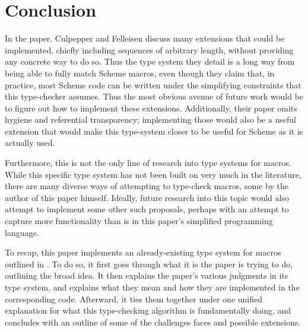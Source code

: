 \documentclass[11pt]{article}
\begin{document}
\section{Conclusion}
In the paper, Culpepper and Felleisen discuss many extensions that could be implemented, chiefly including sequences of arbitrary length, without providing any concrete way to do so. Thus the type system they detail is a long way from being able to fully match Scheme macros, even though they claim that, in practice, most Scheme code can be written under the simplifying constraints that this type-checker assumes. Thus the most obvious avenue of future work would be to figure out how to implement these extensions. Additionally, their paper omits hygiene and referential transparency; implementing those would also be a useful extension that would make this type-system closer to be useful for Scheme as it is actually used.\par

Furthermore, this is not the only line of research into type systems for macros. While this specific type system has not been built on very much in the literature, there are many diverse ways of attempting to type-check macros, some by the author of this paper himself. Ideally, future research into this topic would also attempt to implement some other such proposals, perhaps with an attempt to capture more functionality than is in this paper's simplified programming language.\par

To recap, this paper implements an already-existing type system for macros outlined in \cite{10.1007/978-3-540-30175-2_12}. To do so, it first goes through what it is the paper is trying to do, outlining the broad idea. It then explains the paper's various judgments in its type system, and explains what they mean and how they are implemented in the corresponding code. Afterward, it ties them together under one unified explanation for what this type-checking algorithm is fundamentally doing, and concludes with an outline of some of the challenges faces and possible extensions.






\appendix
\end{document}
